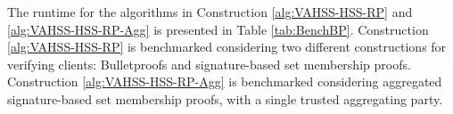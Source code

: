 

The runtime for the algorithms in Construction \ref{alg:VAHSS-HSS-RP} and \ref{alg:VAHSS-HSS-RP-Agg} is presented in Table \ref{tab:BenchBP}. Construction \ref{alg:VAHSS-HSS-RP} is benchmarked considering two different constructions for verifying clients:  Bulletproofs and signature-based set membership proofs. Construction \ref{alg:VAHSS-HSS-RP-Agg} is benchmarked considering aggregated signature-based set membership proofs, with a single trusted aggregating party.
 






